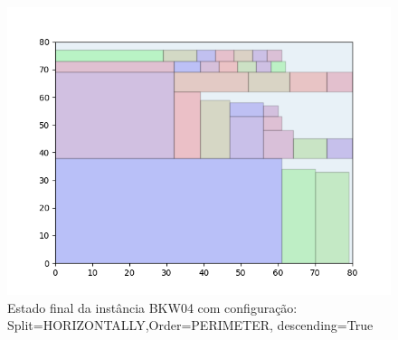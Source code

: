 \begin{figure}[H]
    \centering
    \caption[]{Estado final da instância BKW04 com configuração: Split=HORIZONTALLY,Order=PERIMETER, descending=True}
    \label{fig:bkw04-horizontally-perimeter-true}
    \includegraphics[scale=0.5]{output/figures/bkw/bkw04/horizontally/perimeter/true/00}
\end{figure}